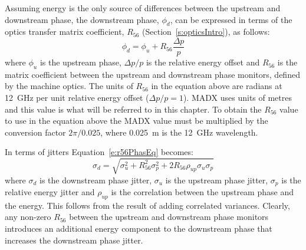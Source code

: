 Assuming energy is the only source of differences between the upstream and downstream phase, the downstream phase, \(\phi_d\), can be expressed in terms of the optics transfer matrix coefficient, \(R_{56}\) (Section~\ref{s:opticsIntro}), as follows:
\begin{equation}
\phi_d = \phi_u + R_{56}\frac{\Delta p}{p}
\label{e:r56PhasEq}
\end{equation}
where \(\phi_u\) is the upstream phase, \(\Delta p / p\) is the relative energy offset and \(R_{56}\) is the matrix coefficient between the upstream and downstream phase monitors, defined by the machine optics. The units of \(R_{56}\) in the equation above are radians at 12~GHz per unit relative energy offset (\(\Delta p/p = 1\)). MADX uses units of metres and this value is what will be referred to in this chapter. To obtain the \(R_{56}\) value to use in the equation above the MADX value must be multiplied by the conversion factor \(2\pi/0.025\), where 0.025~m is the 12~GHz wavelength.

In terms of jitters Equation~\ref{e:r56PhasEq} becomes:
\begin{equation}
\sigma_d = \sqrt{\sigma_u^2 + R_{56}^2\sigma_{p}^2 + 2R_{56}\rho_{up}\sigma_{u}\sigma_{p}}
\label{e:r56JitEq}
\end{equation}
where \(\sigma_d\) is the downstream phase jitter, \(\sigma_u\) is the upstream phase jitter, \(\sigma_p\) is the relative energy jitter and \(\rho_{up}\) is the correlation between the upstream phase and the energy. This follows from the result of adding correlated variances. Clearly, any non-zero \(R_{56}\) between the upstream and downstream phase monitors introduces an additional energy component to the downstream phase that increases the downstream phase jitter.

